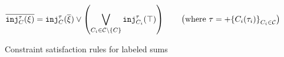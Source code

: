 
\begin{figure}[ht]

  \begin{mathpar}
  \end{mathpar}


  \begin{align*}
    \cdual{\cinj{C}{\tau}{\xi}} & = \cinj{C}{\tau}{\cdual{\xi}} \vee \left(
    \bigvee_{C_i \in \tagset \setminus \{C\}} \cinj{C_i}{\tau}{\ctruth}
    \right)
    \qquad \left(\text{where }\tau = \tlabeledsum{C_i(\tau_i)}_{C_i \in \tagset}\right)
  \end{align*}


  \begin{mathpar}
  \end{mathpar}


  \begin{mathpar}

  \end{mathpar}

  \caption{Constraint satisfaction rules for labeled sums}
  \label{fig:labeled-sums-constraint-rules}
\end{figure}
